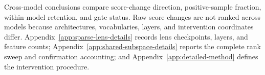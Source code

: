 Cross-model conclusions compare score-change direction, positive-sample fraction, within-model retention, and gate status. Raw score changes are not ranked across models because architectures, vocabularies, layers, and intervention coordinates differ. Appendix~\ref{app:sparse-lens-details} records lens checkpoints, layers, and feature counts; Appendix~\ref{app:shared-subspace-details} reports the complete rank sweep and confirmation accounting; and Appendix~\ref{app:detailed-method} defines the intervention procedure.
